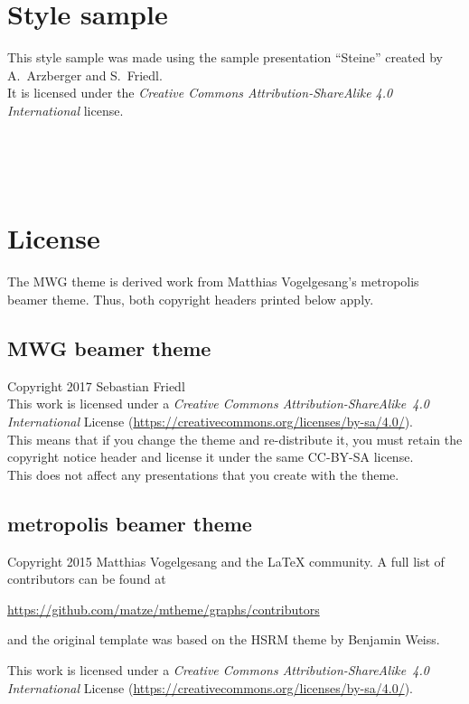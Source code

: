 \documentclass[12pt,a4paper]{scrartcl}
\begin{document}
	\section{Style sample}
	This style sample was made using the sample presentation \enquote{Steine} created by A.~Arzberger and S.~Friedl. \\
	It is licensed under the \textit{Creative Commons Attribution-ShareAlike 4.0 International} license.
	\begin{center}
		  \\
		  \\
		  \\
		 
	\end{center}

	
	\section{License}
	The MWG theme is derived work from Matthias Vogelgesang's metropolis beamer theme. Thus, both copyright headers printed below apply.
	
	\subsection*{MWG beamer theme}
	Copyright 2017 Sebastian Friedl \\
	This work is licensed under a \textit{Creative Commons Attribution-ShareAlike~4.0 International} License (\url{https://creativecommons.org/licenses/by-sa/4.0/}). \\
	This means that if you change the theme and re-distribute it, you must retain the copyright notice header and license it under the same CC-BY-SA license. \\
	This does not affect any presentations that you create with the theme.
	
	\subsection*{metropolis beamer theme}
	Copyright 2015 Matthias Vogelgesang and the LaTeX community. A full list of contributors can be found at
	\begin{center}
		\url{https://github.com/matze/mtheme/graphs/contributors}
	\end{center}
	and the original template was based on the HSRM theme by Benjamin Weiss.

	This work is licensed under a \textit{Creative Commons Attribution-ShareAlike~4.0 International} License (\url{https://creativecommons.org/licenses/by-sa/4.0/}).
\end{document}
